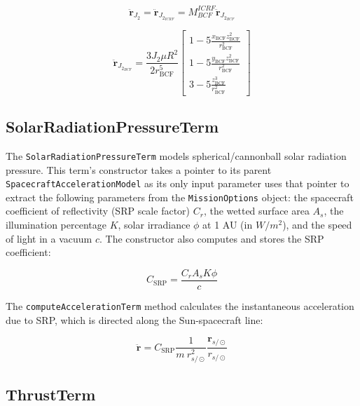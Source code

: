 \begin{equation}
\label{eq:aBCFtoICRF}
\ddot{\mathbf{r}}_{J_2} = \ddot{\mathbf{r}}_{J_{2_{ICRF}}} = M^{ICRF}_{BCF}\ddot{\mathbf{r}}_{J_{2_{BCF}}}
\end{equation}

\begin{equation}
\ddot{\mathbf{r}}_{J_{2_{BCF}}} = \frac{3J_2 \mu R^2}{2r^5_{\text{BCF}}} \begin{bmatrix} 1 - 5\frac{x_{\text{BCF}}z^2_{\text{BCF}}}{r^2_{\text{BCF}}} \\ 1 - 5\frac{y_{\text{BCF}}z^2_{\text{BCF}}}{r^2_{\text{BCF}}} \\ 3 - 5\frac{z^3_{\text{BCF}}}{r^2_{\text{BCF}}} \end{bmatrix}
\end{equation}

\subsection{SolarRadiationPressureTerm}
\label{sec:SolarRadiationPressureTerm}

The \texttt{SolarRadiationPressureTerm} models spherical/cannonball solar radiation pressure. This term's constructor takes a pointer to its parent \texttt{SpacecraftAccelerationModel} as its only input parameter uses that pointer to extract the following parameters from the \texttt{MissionOptions} object: the spacecraft coefficient of reflectivity (SRP scale factor) $C_r$, the wetted surface area $A_s$, the illumination percentage $K$, solar irradiance $\phi$ at 1 AU (in $W/m^2$), and the speed of light in a vacuum $c$. The constructor also computes and stores the SRP coefficient:

\begin{equation}
C_{\text{SRP}} = \frac{C_r A_{s} K \phi}{c} \label{eq:SRP_coeff}
\end{equation}

The \texttt{computeAccelerationTerm} method calculates the instantaneous acceleration due to SRP, which is directed along the Sun-spacecraft line:

\begin{equation}
\ddot{\mathbf{r}} = C_{\text{SRP}}\frac{1}{m ~ r_{s/\odot}^2}\frac{\mathbf{r}_{s/\odot}}{r_{s/\odot}} \label{eq:EOM_SRP}
\end{equation}

\subsection{ThrustTerm}
\label{sec:ThrustTerm}

